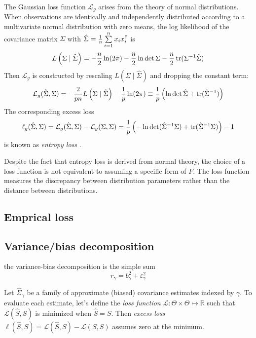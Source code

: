 The Gaussian loss function $\mathcal L_g$  arises from the theory of normal distributions. When observations are identically and independently distributed according to a multivariate normal distribution with zero means, the log likelihood of the covariance matrix $\Sigma$ with $\hat\Sigma = \frac 1 n \sum\limits_{i=1}^n x_i x_i^\intercal$ is  
\begin{equation}
L\left(\Sigma \mid \hat\Sigma\right) = -\frac n 2 \ln(2\pi) - \frac n 2 \ln \det \Sigma - \frac n 2 \operatorname{tr}(\Sigma^{-1} \hat \Sigma)
\end{equation}
Then $\mathcal L_g$ is constructed by rescaling $L\left(\Sigma \mid \hat\Sigma\right)$ and dropping the constant term:
\begin{equation}
\mathcal L_g(\hat\Sigma,\Sigma) 
=  -\frac 2 {pn} L\left(\Sigma \mid \hat\Sigma \right) - \frac 1 p \ln(2\pi) 
\equiv  \frac 1 p\left(\ln \det \hat \Sigma + \operatorname{tr}(\hat \Sigma^{-1}) \right) 
\end{equation}
The corresponding excess loss 
\begin{equation}
\ell_g(\hat\Sigma,\Sigma) = \mathcal L_g(\hat\Sigma,\Sigma) - \mathcal L_g(\Sigma,\Sigma)  
= \frac 1 p \left(-\ln \det (\hat \Sigma^{-1} \Sigma) + \operatorname{tr}(\hat \Sigma^{-1}\Sigma)\right) - 1
\end{equation}
is known as \emph{entropy loss} \citep{James:1961}.

Despite the fact that entropy loss is derived from normal theory, the choice of a loss function is not equivalent to assuming a specific form of $F$. The loss function measures the discrepancy between distribution parameters rather than the distance between distributions.  

\subsection{Emprical loss}



\subsection{Variance/bias decomposition}
the variance-bias decomposition is the simple sum
\begin{equation}
r_\gamma =  b_\gamma^2 + \varepsilon_\gamma^2
\end{equation}




Let $\hat\Sigma_\gamma$ be a family of approximate (biased) covariance estimates indexed by $\gamma$. To evaluate each estimate, let's define the \emph{loss function} $\mathcal L : \Theta \times \Theta \mapsto \mathbb R$ such that $\mathcal L(\hat S,S)$ is minimized when $\hat S = S$.  Then \emph{excess loss} $\ell(\hat S, S) = \mathcal L(\hat S, S) - \mathcal L(S,S)$ assumes zero at the minimum. 

